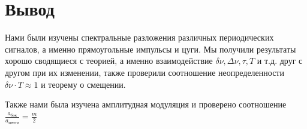 \documentclass[a4paper,12pt]{extarticle}
\begin{document}
\section*{Вывод}
Нами были изучены спектральные разложения различных периодических сигналов, а именно прямоугольные импульсы и цуги. Мы получили результаты хорошо сводящиеся с теорией, а именно взаимодействие $\delta \nu, \Delta \nu, \tau, T$ и т.д. друг с другом при их изменении, также проверили соотношение неопределенности $\delta \nu \cdot T \approx 1 $ и теорему о смещении.

Также нами была изучена амплитудная модуляция и проверено соотношение $\frac{a_{\text{бок}}}{a_{\text{центр}}} = \frac{m}{2}$
\end{document}
